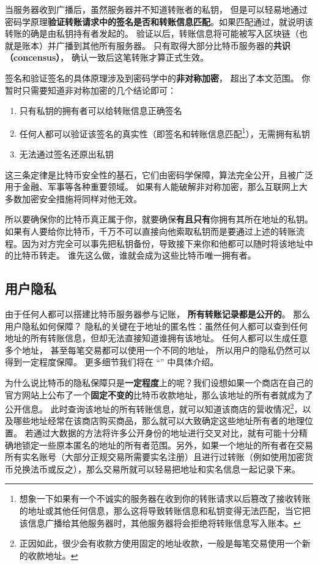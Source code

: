 当服务器收到广播后，虽然服务器并不知道转账者的私钥， 但是可以轻易地通过密码学原理\textbf{验证转账请求中的签名是否和转账信息匹配}。如果匹配通过，就说明该转账的确是由私钥持有者发起的。 验证以后，转账信息将可能被写入区块链（也就是账本）并广播到其他所有服务器。 只有取得大部分比特币服务器的\textbf{共识（concensus）}， 确认一致后这笔转账才算正式生效。

签名和验证签名的具体原理涉及到密码学中的\textbf{非对称加密}， 超出了本文范围。 你暂时只需要知道非对称加密的几个结论即可：
\begin{enumerate}
\item 只有私钥的拥有者可以给转账信息正确签名
\item 任何人都可以验证该签名的真实性（即签名和转账信息匹配\footnote{想象一下如果有一个不诚实的服务器在收到你的转账请求以后篡改了接收转账的地址或其他任何信息，那么这将导致转账信息和私钥变得无法匹配，当它把该信息广播给其他服务器时，其他服务器将会拒绝将转账信息写入账本。}），无需拥有私钥
\item 无法通过签名还原出私钥
\end{enumerate}
这三条定律是比特币安全性的基石，它们由密码学保障，算法完全公开，且被广泛用于金融、军事等各种重要领域。 如果有人能破解非对称加密，那么互联网上大多数加密安全措施将同样对他无效。

所以要确保你的比特币真正属于你，就要确保\textbf{有且只有}你拥有其所在地址的私钥。 如果有人要给你比特币，千万不可以直接向他索取私钥而是要通过上述的转账流程。因为对方完全可以事先把私钥备份，导致接下来你和他都可以随时将该地址中的比特币转走。 谁先这么做，谁就会成为这些比特币唯一拥有者。


\subsection{用户隐私}
由于任何人都可以搭建比特币服务器参与记账， \textbf{所有转账记录都是公开的}。 那么用户隐私如何保障？ 隐私的关键在于地址的匿名性：虽然任何人都可以查到任何地址的所有转账信息，但却无法直接知道谁拥有该地址。 任何人都可以生成任意多个地址， 甚至每笔交易都可以使用一个不同的地址， 所以用户的隐私仍然可以得到一定程度保障。 更多细节我们将在 “” 中具体介绍。

为什么说比特币的隐私保障只是\textbf{一定程度}上的呢？我们设想如果一个商店在自己的官方网站上公布了一个\textbf{固定不变的}比特币收款地址，那么该地址的所有者就成为了公开信息。 此时查询该地址的所有转账信息，就可以知道该商店的营收情况\footnote{正因如此，很少会有收款方使用固定的地址收款，一般是每笔交易使用一个新的收款地址。}，以及哪些地址经常在该商店购买商品，那么就可以大致确定这些地址所有者的地理位置。 若通过大数据的方法将许多公开身份的地址进行交叉对比，就有可能十分精确地锁定一些原本匿名的地址的所有者范围。另外，如果一个地址的所有者在交易所有实名账号（大部分正规交易所需要实名注册）且进行过转账（例如使用加密货币兑换法币或反之），那么交易所就可以轻易把地址和实名信息一起记录下来。


